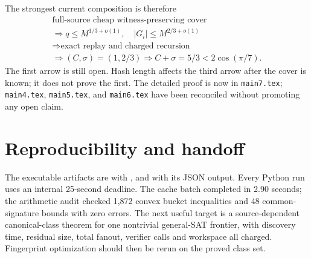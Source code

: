 \documentclass[11pt]{article}
\begin{document}
The strongest current composition is therefore
\[
\begin{gathered}
\text{full-source cheap witness-preserving cover}\\
\Longrightarrow q\le M^{1/3+o(1)},\quad |G_i|\le M^{2/3+o(1)}\\
\Longrightarrow \text{exact replay and charged recursion}\\
\Longrightarrow (C,\sigma)=(1,2/3)\Longrightarrow C+\sigma=5/3<2\cos(\pi/7).
\end{gathered}
\]
The first arrow is still open.  Hash length affects the third arrow after the
cover is known; it does not prove the first.  The detailed proof is now in
\texttt{main7.tex}; \texttt{main4.tex}, \texttt{main5.tex}, and
\texttt{main6.tex} have been reconciled without promoting any open claim.

\section{Reproducibility and handoff}
The executable artifacts are
 with
, and
 with its JSON output.  Every
Python run uses an internal 25-second deadline.  The cache batch completed in
2.90 seconds; the arithmetic audit checked 1,872 convex bucket inequalities
and 48 common-signature bounds with zero errors.  The next useful target is a
source-dependent canonical-class theorem for one nontrivial general-SAT
frontier, with discovery time, residual size, total fanout, verifier calls and
workspace all charged.  Fingerprint optimization should then be rerun on the
proved class set.

\end{document}
